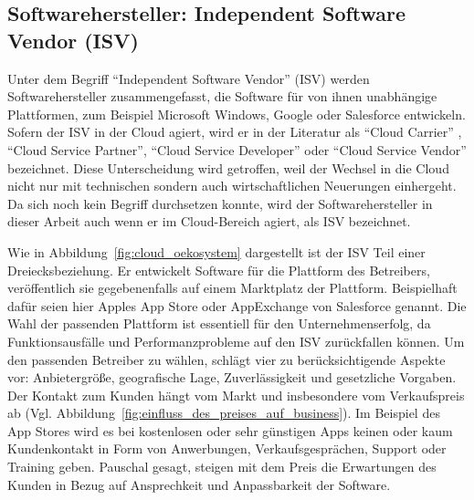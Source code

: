 
\subsection{Softwarehersteller: Independent Software Vendor (ISV)}
\label{cha:isv}
Unter dem Begriff "`Independent Software Vendor"' (ISV) werden 
Softwarehersteller 
zusammengefasst, die Software für von ihnen unabhängige Plattformen, zum 
Beispiel Microsoft Windows, Google oder Salesforce entwickeln. Sofern der ISV 
in der Cloud agiert, wird er in der Literatur als "`Cloud Carrier"'
, "`Cloud Service Partner"', 
"`Cloud Service Developer"' 
 oder "`Cloud Service 
Vendor"'  bezeichnet. Diese 
Unterscheidung wird getroffen, weil der Wechsel in die Cloud nicht nur mit 
technischen sondern auch wirtschaftlichen Neuerungen einhergeht. Da sich noch 
kein Begriff durchsetzen konnte, wird der Softwarehersteller in dieser Arbeit 
auch wenn er im Cloud-Bereich agiert, als ISV bezeichnet.



Wie in Abbildung~\ref{fig:cloud_oekosystem} dargestellt ist der ISV Teil einer 
Dreiecksbeziehung. Er entwickelt Software für die Plattform des Betreibers, 
veröffentlich sie gegebenenfalls auf einem Marktplatz der Plattform. 
Beispielhaft dafür seien hier Apples App Store oder AppExchange von Salesforce 
genannt. Die Wahl der passenden Plattform ist essentiell für den 
Unternehmenserfolg, da Funktionsausfälle und Performanzprobleme auf den 
ISV zurückfallen können. Um den passenden Betreiber zu wählen, schlägt 
 vier zu berücksichtigende Aspekte 
vor: Anbietergröße, geografische Lage, Zuverlässigkeit und gesetzliche 
Vorgaben. \\

Der Kontakt zum Kunden hängt vom Markt und insbesondere vom Verkaufspreis ab 
(Vgl. Abbildung~\ref{fig:einfluss_des_preises_auf_business}). Im Beispiel des 
App Stores wird es bei kostenlosen oder sehr günstigen Apps keinen oder kaum 
Kundenkontakt in Form von Anwerbungen, Verkaufsgesprächen, Support oder  
Training geben. Pauschal gesagt, steigen mit dem Preis die Erwartungen des 
Kunden in Bezug auf Ansprechkeit und Anpassbarkeit der Software. 

